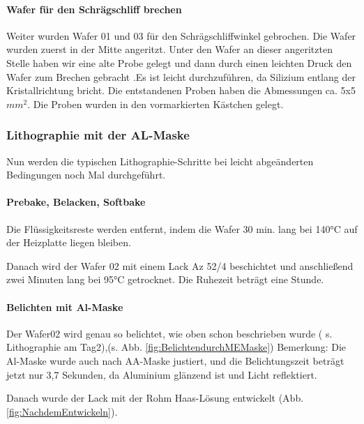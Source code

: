 \paragraph[Wafer für den Schrägschliff brechen]{Wafer für den Schrägschliff brechen }


Weiter wurden Wafer 01 und 03 für den Schrägschliffwinkel gebrochen.
Die Wafer wurden zuerst in der Mitte angeritzt. Unter den Wafer an dieser angeritzten
Stelle haben wir eine alte Probe gelegt und dann durch einen leichten Druck den Wafer
zum Brechen gebracht .Es ist leicht durchzuführen, da Silizium entlang der
Kristallrichtung bricht. Die entstandenen Proben haben die Abmessungen ca. 5x5 $mm^{2}$.
Die Proben wurden in den vormarkierten Kästchen gelegt.



\subsubsection[Lithographie mit der AL-Maske]{Lithographie mit der AL-Maske }

Nun werden die typischen Lithographie-Schritte bei leicht abgeänderten Bedingungen noch Mal durchgeführt.

\paragraph[Prebake, Belacken, Softbake]{Prebake, Belacken, Softbake}


Die Flüssigkeitsreste werden entfernt, indem die Wafer 30 min. lang bei 140°C auf der Heizplatte liegen bleiben.

Danach wird der Wafer 02 mit einem Lack  Az 52/4 beschichtet und anschließend zwei Minuten lang bei 95°C getrocknet. Die Ruhezeit beträgt eine Stunde.


\paragraph[Belichten mit Al-Maske]{Belichten mit Al-Maske  }


Der Wafer02 wird genau so belichtet, wie oben schon beschrieben wurde ( s. Lithographie am Tag2),(s. Abb. \ref{fig:BelichtendurchMEMaske}) Bemerkung: Die Al-Maske wurde auch nach AA-Maske justiert, und die Belichtungszeit beträgt jetzt nur 3,7 Sekunden, da Aluminium glänzend ist und Licht reflektiert.

 Danach wurde der Lack mit der Rohm Haas-Lösung entwickelt (Abb. \ref{fig:NachdemEntwickeln}).


